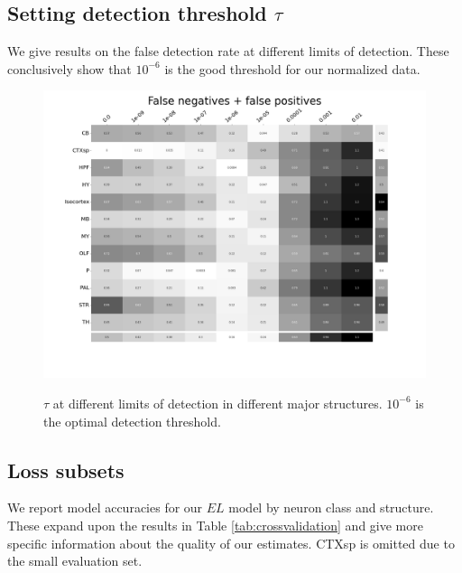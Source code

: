 \subsection{Setting detection threshold $\tau$}
\label{supp:exp_lower}

We give results on the false detection rate at different limits of detection.
These conclusively show that $10^{-6}$ is the good threshold for our normalized data.

\newpage

\begin{figure}[H]
    \centering
    \includegraphics[width = 7in]{figs/Threshold.png}
    \label{fig:threshold}
    \caption{$\tau$ at different limits of detection in different major structures.  $10^{-6}$ is the optimal detection threshold.}
\end{figure}

\newpage

\subsection{Loss subsets}
\label{supp_sec:loss_subsets}

We report model accuracies for our $EL$ model by neuron class and structure.
These expand upon the results in Table \ref{tab:crossvalidation} and give more specific information about the quality of our estimates. 
CTXsp is omitted due to the small evaluation set.

